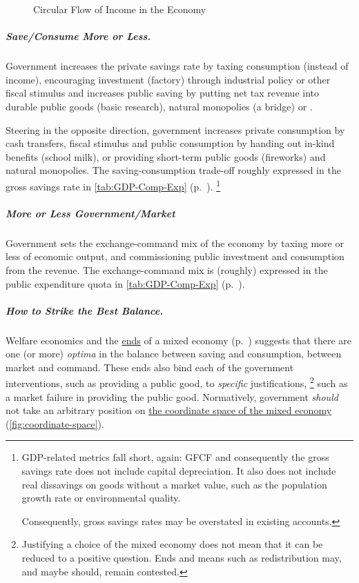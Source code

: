 \begin{figure}[htbp]
	\centering
	\caption[Circular Flow in the Economy]{Circular Flow of Income in the Economy}
	\label{fig:circular-flow}
\end{figure}

\subparagraph[Save More or Less]{Save/Consume More or Less.}
Government increases the private savings rate by taxing consumption (instead of income), encouraging investment (factory) through industrial policy or other fiscal stimulus and increases public saving by putting net tax revenue into durable public goods (basic research), natural monopolies (a bridge) or .

Steering in the opposite direction, government increases private consumption by cash transfers, fiscal stimulus and public consumption by handing out in-kind benefits (school milk), or providing short-term public goods (fireworks) and natural monopolies.
The saving-consumption trade-off roughly expressed in the gross savings rate in \autoref{tab:GDP-Comp-Exp} (p.~\pageref{tab:GDP-Comp-Exp}).
\footnote{
	GDP-related metrics fall short, again:
	\gls{GFCF} and consequently the gross savings rate does not include capital depreciation.
	It also does not include real dissavings on goods without a market value, such as the population growth rate or environmental quality.

	Consequently, gross savings rates may be overstated in existing accounts.
}


\subparagraph[Exchange-Command Mix]{More or Less Government/Market}
Government sets the exchange-command mix of the economy by taxing more or less of economic output, and commissioning public investment and consumption from the revenue.
The exchange-command mix is (roughly) expressed in the public expenditure quota in \autoref{tab:GDP-Comp-Exp} (p.~\pageref{tab:GDP-Comp-Exp}).

\subparagraph[Optima]{How to Strike the Best Balance.}
Welfare economics and the \hyperref[sec:ends]{ends} of a mixed economy (p.~\pageref{sec:ends}) suggests that there are one (or more) \emph{optima} in the balance between saving and consumption, between market and command.
These ends also bind each of the government interventions, such as providing a public good, to \emph{specific} justifications,
\footnote{
	Justifying a choice of the mixed economy does not mean that it can be reduced to a positive question.
	Ends and means such as redistribution may, and maybe should, remain contested.
}
such as a market failure in providing the public good.
Normatively, government \emph{should} not take an arbitrary position on \hyperref[fig:coordinate-space]{the coordinate space of the mixed economy} (\autoref{fig:coordinate-space}).

